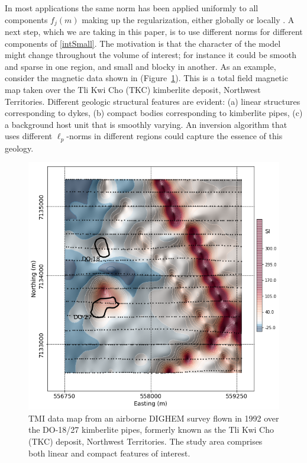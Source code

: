 \documentclass[extra,referee]{gji}
\begin{document}
In most applications the same norm has been applied uniformly to all components $f_j(m)$ making up the regularization, either globally or locally \cite[]{SunLi14}. A next step, which we are taking in this paper, is to use different norms for different components of \eqref{intSmall}. The motivation is that the character of the model might change throughout the volume of interest; for instance it could be smooth and sparse in one region, and small and blocky in another. As an example, consider the magnetic data shown in (Figure~\ref{TKC_Data}). This is a total field magnetic map taken over the Tli Kwi Cho (TKC) kimberlite deposit, Northwest Territories. Different geologic structural features are evident: (a) linear structures corresponding to dykes, (b) compact bodies corresponding to kimberlite pipes, (c) a background host unit that is smoothly varying. An inversion algorithm that uses different $\ell_p$-norms in different regions could capture the essence of this geology.
\begin{figure}
\includegraphics[width=\columnwidth]{Figures/MAG_TKC_DataMap.png}
\caption{TMI data map from an airborne DIGHEM survey flown in 1992 over the DO-18/27 kimberlite pipes, formerly known as the Tli Kwi Cho (TKC) deposit, Northwest Territories. The study area comprises both linear and compact features of interest.}
\label{TKC_Data}
\end{figure}
\end{document}
